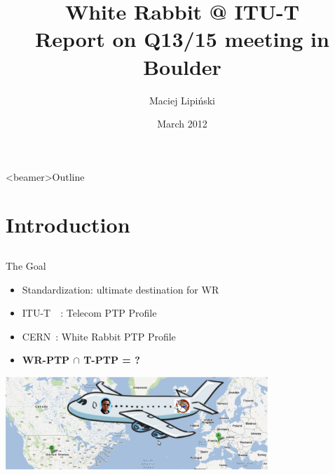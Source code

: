 \documentclass[compress,red]{beamer}
\title[ITU-T Q13/15 meeting report\hspace{2em}\insertframenumber/\inserttotalframenumber]
{White Rabbit @ ITU-T\\ Report on Q13/15 meeting in Boulder}
\institute{
   \begin{center}
    Hardware and Timing Section\\
    CERN
   \end{center}
}
\author{
Maciej Lipi\'{n}ski %
}
\date{March 2012}
\begin{document}
\frame{\titlepage}
\begin{frame}<beamer>{Outline}

    \tableofcontents %

\end{frame}
\section{Introduction}
\subsection{}
\begin{frame}{The Goal}
  
  \begin{itemize}
    \item Standardization: ultimate destination for WR
    \item ITU-T~~: Telecom PTP Profile 
    \item CERN~: White Rabbit PTP Profile 
    \item {\bf WR-PTP $\cap$ T-PTP = ?} 
  \end{itemize}

    \begin{center}
    \includegraphics[height=3.5cm]{misc/gva-dva.png}
    \end{center}


\end{frame}
\end{document}
